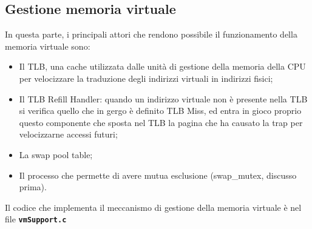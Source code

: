 \documentclass{article}
\begin{document}
\subsection{Gestione memoria virtuale}
In questa parte, i principali attori che rendono possibile il funzionamento della memoria virtuale sono:
\begin{itemize}
  \item Il TLB, una cache utilizzata dalle unità di gestione della memoria della CPU per velocizzare la traduzione degli indirizzi virtuali in indirizzi fisici;
  \item Il TLB Refill Handler: quando un indirizzo virtuale non è presente nella TLB si verifica quello che in gergo è definito TLB Miss, ed entra in gioco proprio questo componente che sposta nel TLB la pagina che ha causato la trap per velocizzarne accessi futuri;
  \item La swap pool table;
  \item Il processo che permette di avere mutua esclusione (swap\_mutex, discusso prima).
\end{itemize}

Il codice che implementa il meccanismo di gestione della memoria virtuale è nel file \texttt{\textbf{vmSupport.c}}
\end{document}
